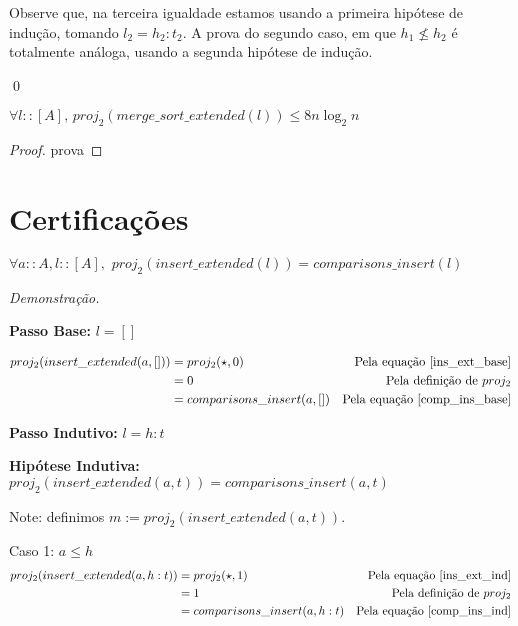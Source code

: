 \documentclass[12pt, oneside, a4paper,english,brazil]{abntex2}
\begin{document}
Observe que, na terceira igualdade estamos usando a primeira hip\'otese de indu\c{c}\~ao, tomando $l_{2} = h_{2} : t_{2}$. A prova do segundo caso, em que $h_{1} \not\le h_{2}$ \'e totalmente an\'aloga, usando a segunda hip\'otese de indu\c{c}\~ao.

\qed

\begin{teorema}
  $\forall l :: [A], \, proj_{2}(merge\_sort\_extended(l)) \le 8 n \log_{2}n$
\end{teorema}

\begin{proof}
  prova
\end{proof}

\section{Certifica\c{c}\~oes}

\begin{teorema}
  $\forall a :: A, l :: [A], \,\, proj_{2}(insert\_extended(l)) = comparisons\_insert(l)$
\end{teorema}

\noindent \textit{Demonstra\c{c}\~ao.}

\textbf{Passo Base: } $l = []$

\begin{align*}
  proj_{2}(insert\_extended(a, [])) &= proj_{2}(\star, 0) &\text{Pela equa\c{c}\~ao \ref{ins_ext_base}}\\
                                 &= 0 &\text{Pela defini\c{c}\~ao de } proj_{2} \\
  &= comparisons\_insert(a, []) &\text{Pela equa\c{c}\~ao \ref{comp_ins_base}}
\end{align*}

\textbf{Passo Indutivo: } $l = h : t$

\textbf{Hip\'otese Indutiva: } $proj_{2}(insert\_extended(a, t)) = comparisons\_insert(a, t)$

Note: definimos $m := proj_{2}(insert\_extended(a, t))$.

Caso 1: $a \le h$
\begin{align*}
  proj_{2}(insert\_extended(a, h : t)) &= proj_{2}(\star, 1) &\text{Pela equa\c{c}\~ao \ref{ins_ext_ind}}\\
                                       &= 1 &\text{Pela defini\c{c}\~ao de } proj_{2} \\
  &= comparisons\_insert(a, h : t) &\text{Pela equa\c{c}\~ao \ref{comp_ins_ind}}
\end{align*}
\end{document}
